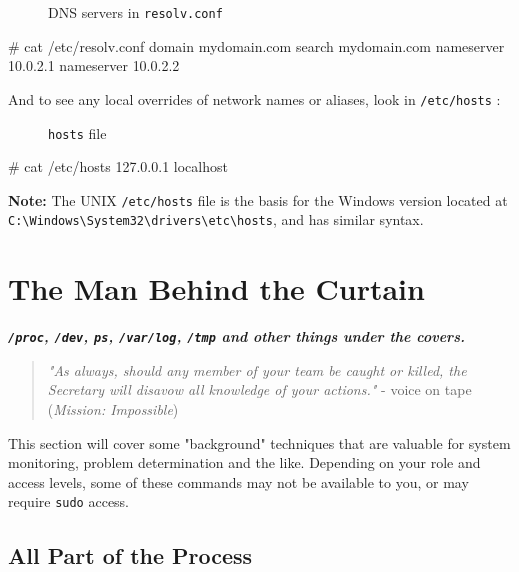 \documentclass[10pt,american,]{book}
\newenvironment{Shaded}{\begin{snugshade}}{\end{snugshade}}
\newcommand{\KeywordTok}[1]{\textcolor[rgb]{0.13,0.29,0.53}{\textbf{{#1}}}}
\newcommand{\CommentTok}[1]{\textcolor[rgb]{0.56,0.35,0.01}{\textit{{#1}}}}
\newcommand{\NormalTok}[1]{{#1}}
\numberwithin{figure}{chapter}
\DeclareRobustCommand{\drcap}[1]{\begin{figure}[H]\caption{#1}\end{figure}}
\renewcommand{\KeywordTok}[1]{{#1}}
\renewcommand{\CommentTok}[1]{{#1}}
\renewcommand{\NormalTok}[1]{{#1}}
\begin{document}
\drcap{DNS servers in \texttt{resolv.conf}}

\begin{Shaded}
\begin{Highlighting}[]
\CommentTok{# cat /etc/resolv.conf}
\KeywordTok{domain} \NormalTok{mydomain.com}
\KeywordTok{search} \NormalTok{mydomain.com}
\KeywordTok{nameserver} \NormalTok{10.0.2.1}
\KeywordTok{nameserver} \NormalTok{10.0.2.2}
\end{Highlighting}
\end{Shaded}

And to see any local overrides of network names or aliases, look in
\texttt{/etc/hosts}
:

\drcap{\texttt{hosts} file}

\begin{Shaded}
\begin{Highlighting}[]
\CommentTok{# cat /etc/hosts}
\KeywordTok{127.0.0.1}       \NormalTok{localhost}
\end{Highlighting}
\end{Shaded}

\textbf{Note:} The UNIX \texttt{/etc/hosts} file is the basis for the
Windows version located at
\texttt{C:\textbackslash{}Windows\textbackslash{}System32\textbackslash{}drivers\textbackslash{}etc\textbackslash{}hosts},
and has similar syntax.

\hypertarget{the-man-behind-the-curtain}{\chapter{The Man Behind the
Curtain}\label{the-man-behind-the-curtain}}

\textbf{\emph{\texttt{/proc}, \texttt{/dev}, \texttt{ps},
\texttt{/var/log}, \texttt{/tmp} and other things under the covers.}}

\begin{quote}
\emph{"As always, should any member of your team be caught or killed,
the Secretary will disavow all knowledge of your actions."} - voice on
tape (\emph{Mission: Impossible})
\end{quote}

This section will cover some "background" techniques that are valuable
for system monitoring, problem determination and the like. Depending on
your role and access levels, some of these commands may not be available
to you, or may require \texttt{sudo} access.

\section*{All Part of the Process}\label{all-part-of-the-process}
\end{document}
